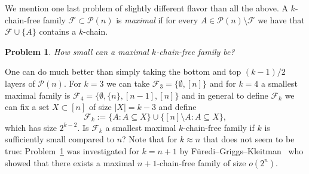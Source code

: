 \documentclass[12pt]{article}
\newtheorem{proble}[theorem]{Problem}
\numberwithin{equation}{section}
\def\F{\mathcal{F}}
\def\P{\mathcal{P}}
\begin{document}
We mention one last problem of slightly different flavor than all the above. A $k$-chain-free family $\F\subset \P(n)$ is \emph{maximal} if for every $A\in \P(n)\setminus \F$ we have that $\F\cup \{A\}$ contains a $k$-chain. 

\begin{proble}\label{furedilike}
How small can a maximal $k$-chain-free family be?
\end{proble}

One can do much better than simply taking the bottom and top $(k-1)/2$ layers of $\P(n)$. For $k=3$ we can take $\F_3=\{\emptyset, [n]\}$ and for $k=4$ a smallest maximal family is $\F_4=\{\emptyset, \{n\}, [n-1], [n]\}$ and in general to define $\F_k$ we can fix a set $X\subset [n]$ of size $|X|=k-3$ and define $$\F_k := \{A:A\subseteq X\} \cup \{[n]\setminus A: A\subseteq X\},$$
which has size $2^{k-2}$.
Is $\F_k$ a smallest maximal $k$-chain-free family if $k$ is sufficiently small compared to $n$? Note that for $k\approx n$ that does not seem to be true: Problem~\ref{furedilike} was investigated for $k=n+1$ by F\"{u}redi--Griggs--Kleitman~\cite{furedigriggskleitman} who showed that there exists a maximal $n+1$-chain-free family of size $o(2^n)$.
\end{document}

